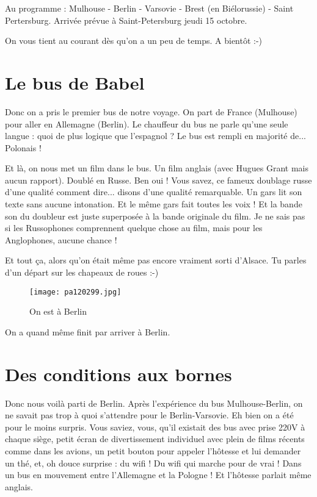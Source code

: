 \documentclass{book}
\begin{document}
Au programme : Mulhouse - Berlin - Varsovie - Brest (en Biélorussie) - Saint Pertersburg. Arrivée prévue à Saint-Petersburg jeudi 15 octobre.

On vous tient au courant dès qu'on a un peu de temps. A bientôt :-)

\chapter{Le bus de Babel}
Donc on a pris le premier bus de notre voyage. On part de France (Mulhouse) pour aller en Allemagne (Berlin). Le chauffeur du bus ne parle qu'une seule langue : quoi de plus logique que l'espagnol ? Le bus est rempli en majorité de... Polonais !

Et là, on nous met un film dans le bus. Un film anglais (avec Hugues Grant mais aucun rapport). Doublé en Russe. Ben oui ! Vous savez, ce fameux doublage russe d'une qualité comment dire... disons d'une qualité remarquable. Un gars lit son texte sans aucune intonation. Et le même gars fait toutes les voix ! Et la bande son du doubleur est juste superposée à la bande originale du film. Je ne sais pas si les Russophones comprennent quelque chose au film, mais pour les Anglophones, aucune chance !

Et tout ça, alors qu'on était même pas encore vraiment sorti d'Alsace. Tu parles d'un départ sur les chapeaux de roues :-)


\begin{figure}[h]
\centering
\texttt{[image: pa120299.jpg]}
\caption*{On est à Berlin}
\end{figure}

On a quand même finit par arriver à Berlin.

\chapter{Des conditions aux bornes}
Donc nous voilà parti de Berlin. Après l'expérience du bus Mulhouse-Berlin, on ne savait pas trop à quoi s'attendre pour le Berlin-Varsovie.
Eh bien on a été pour le moins surpris. Vous saviez, vous, qu'il existait des bus avec prise 220V à chaque siège, petit écran de divertissement individuel avec plein de films récents comme dans les avions, un petit bouton pour appeler l’hôtesse et lui demander un thé, et, oh douce surprise : du wifi ! Du wifi qui marche pour de vrai ! Dans un bus en mouvement entre l'Allemagne et la Pologne !
Et l’hôtesse parlait même anglais.
\end{document}
